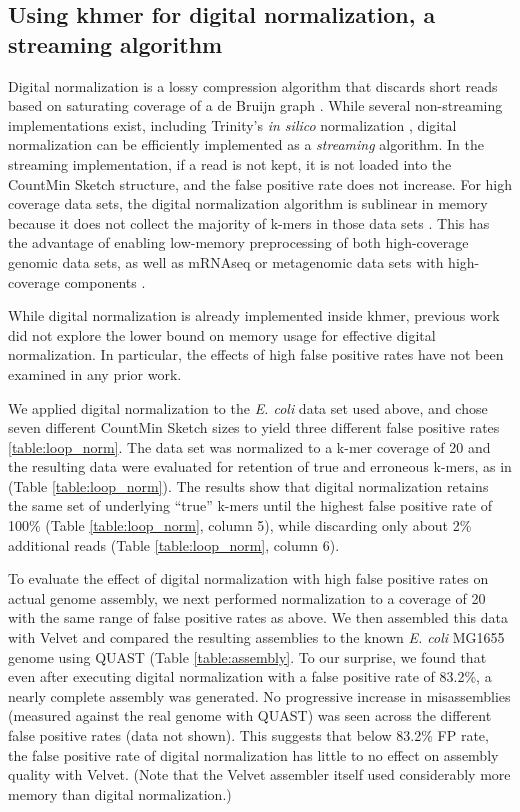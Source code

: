 \documentclass[10pt]{article}
\begin{document}
\subsection*{Using khmer for digital normalization, a streaming algorithm}

Digital normalization is a lossy compression algorithm that discards
short reads based on saturating coverage of a de Bruijn graph
\cite{Brown2012}.  While several non-streaming implementations exist,
including Trinity's {\em in silico} normalization
\cite{Haas2013,Brown2012blog}, digital normalization can be
efficiently implemented as a {\em streaming} algorithm. In the
streaming implementation, if a read is not kept, it is not loaded into
the CountMin Sketch structure, and the false positive rate does not
increase.  For high coverage data sets, the digital normalization
algorithm is sublinear in memory because it does not collect the
majority of k-mers in those data sets \cite{Brown2012}.  This has the
advantage of enabling low-memory preprocessing of both high-coverage
genomic data sets, as well as mRNAseq or metagenomic data sets with
high-coverage components \cite{Brown2012, Howe2012}.

While digital normalization is already implemented inside khmer,
previous work did not explore the lower bound on memory usage for
effective digital normalization.  In particular, the effects of high
false positive rates have not been examined in any prior work.

We applied digital normalization to the {\em E. coli} data set used
above, and chose seven different CountMin Sketch sizes to yield three
different false positive rates \ref{table:loop_norm}.  The data set
was normalized to a k-mer coverage of 20 and the resulting data were
evaluated for retention of true and erroneous k-mers, as in
\cite{Brown2012} (Table \ref{table:loop_norm}).  The results show that
digital normalization retains the same set of underlying ``true''
k-mers until the highest false positive rate of 100\% (Table
\ref{table:loop_norm}, column 5), while discarding only about 2\%
additional reads (Table \ref{table:loop_norm}, column 6).

To evaluate the effect of digital normalization with high false
positive rates on actual genome assembly, we next performed
normalization to a coverage of 20 with the same range of false
positive rates as above.  We then assembled this data with Velvet
\cite{Zerbino2008} and compared the resulting assemblies to the known
     {\em E. coli} MG1655 genome using QUAST (Table
     \ref{table:assembly}.  To our surprise, we found that even after
     executing digital normalization with a false positive rate of
     83.2\%, a nearly complete assembly was generated.  No progressive
     increase in misassemblies (measured against the real genome with
     QUAST) was seen across the different false positive rates (data
     not shown). This suggests that below 83.2\% FP rate, the false
     positive rate of digital normalization has little to no effect on
     assembly quality with Velvet.  (Note that the Velvet assembler
     itself used considerably more memory than digital normalization.)
\end{document}
